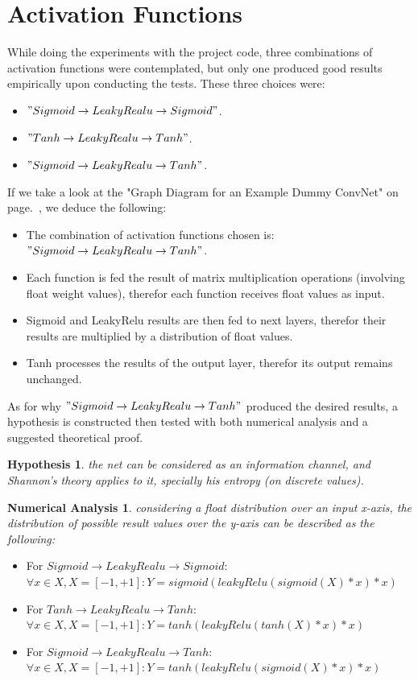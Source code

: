 \documentclass[a4paper, 12pt]{report}
\newcommand\tab[1][1cm]{\hspace*{#1}}
\newtheorem{hypothesis}{Hypothesis}
\newtheorem{numericalanalysis}{Numerical Analysis}
\begin{document}
\section{\textbf{Activation Functions}}
While doing the experiments with the project code, three combinations of activation functions were contemplated, but only one produced good results empirically upon conducting the tests. These three choices were:
\begin{itemize}[nosep]
	\item $" Sigmoid \rightarrow LeakyRealu \rightarrow Sigmoid "$.
	\item $" Tanh \rightarrow LeakyRealu \rightarrow Tanh "$.
	\item $" Sigmoid \rightarrow LeakyRealu \rightarrow Tanh "$.
\end{itemize}
If we take a look at the "Graph Diagram for an Example Dummy ConvNet" on page.~\pageref{fig:SimpleNetDiagram}, we deduce the following:
\begin{itemize}[nosep]
	\item The combination of activation functions chosen is: $" Sigmoid \rightarrow LeakyRealu \rightarrow Tanh "$.
	\item Each function is fed the result of matrix multiplication operations (involving float weight values), therefor each function receives float values as input.
	\item Sigmoid and LeakyRelu results are then fed to next layers, therefor their results are multiplied by a distribution of float values.
	\item Tanh processes the results of the output layer, therefor its output remains unchanged.
\end{itemize}
As for why $" Sigmoid \rightarrow LeakyRealu \rightarrow Tanh "$ produced the desired results, a hypothesis is constructed then tested with both numerical analysis and a suggested theoretical proof.
\begin{hypothesis}\label{hypothesis:1}
	the net can be considered as an information channel, and Shannon's theory \citep{Shannon:2001:MTC:584091.584093} applies to it, specially his entropy (on discrete values).
\end{hypothesis}
\begin{numericalanalysis}\label{analysis:1}
	considering a float distribution over an input x-axis, the distribution of possible result values over the y-axis can be described as the following:
\end{numericalanalysis}
\begin{itemize}[nosep]
	\item For $ Sigmoid \rightarrow LeakyRealu \rightarrow Sigmoid $:\\\tab $ \forall x \in X, X = [-1, +1]: Y = sigmoid(leakyRelu(sigmoid(X)*x)*x) $
	\item For $ Tanh \rightarrow LeakyRealu \rightarrow Tanh $:\\\tab $ \forall x \in X, X = [-1, +1]: Y = tanh(leakyRelu(tanh(X)*x)*x) $
	\item For $ Sigmoid \rightarrow LeakyRealu \rightarrow Tanh $:\\\tab $ \forall x \in X, X = [-1, +1]: Y = tanh(leakyRelu(sigmoid(X)*x)*x) $
\end{itemize}
\end{document}
